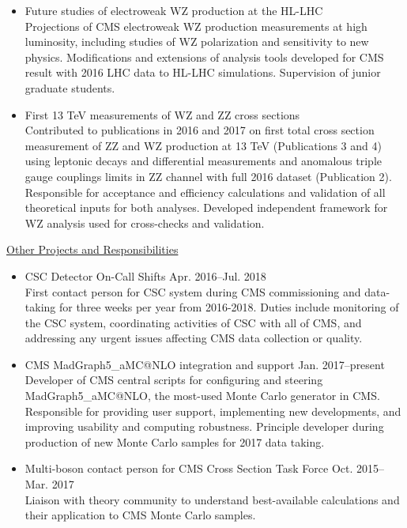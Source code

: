 \documentclass[10pt]{res} %
\begin{document}
\begin{resume}
\begin{itemize}
  \item{Future studies of electroweak WZ production at the HL-LHC} \\
    Projections of CMS electroweak WZ production measurements at high luminosity, including studies of
    WZ polarization and sensitivity to new physics. 
    Modifications and extensions of analysis tools developed for CMS result with 2016 LHC data to 
    HL-LHC simulations. Supervision of junior graduate students.

  \item{First 13 TeV measurements of WZ and ZZ cross sections} \\
    Contributed to publications in 2016 and 2017 on first total cross section measurement 
    of ZZ and WZ production at 13 TeV (Publications 3 and 4) using leptonic decays
    and differential measurements and anomalous
    triple gauge couplings limits in ZZ channel
    with full 2016 dataset (Publication 2). 
    Responsible for acceptance
    and efficiency calculations and validation of all theoretical inputs for both analyses. 
    Developed independent framework for WZ analysis used for cross-checks and validation.

\end{itemize}

\underline{Other Projects and Responsibilities}
\vspace{2mm}
\begin{itemize}
  \item CSC Detector On-Call Shifts \hfill{Apr. 2016--Jul. 2018} \\
    First contact person for CSC system during CMS commissioning and data-taking for three weeks per year
    from 2016-2018. Duties include monitoring of the CSC system, coordinating activities of CSC with all of CMS, 
    and addressing any urgent issues affecting CMS data collection or quality.

  \item CMS MadGraph5\_aMC@NLO integration and support \hfill{Jan. 2017--present} \\
    Developer of CMS central scripts
    for configuring and steering MadGraph5\_aMC@NLO, the most-used Monte Carlo generator in CMS. Responsible for 
    providing user support, implementing new developments, 
    and improving usability and computing robustness. Principle developer during production
    of new Monte Carlo samples for 2017 data taking.

  \item Multi-boson contact person for CMS Cross Section Task Force \hfill{Oct. 2015--Mar. 2017} \\
    Liaison with theory community to understand best-available calculations and 
    their application to CMS Monte Carlo samples. 


\end{itemize}
\end{resume}
\end{document}
